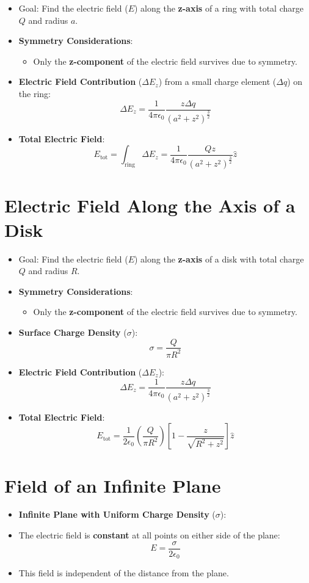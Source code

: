 \documentclass{article}
\begin{document}
\begin{itemize}
    \item Goal: Find the electric field (\(E\)) along the \textbf{z-axis} of a ring with total charge \(Q\) and radius \(a\).
    \item \textbf{Symmetry Considerations}:
    \begin{itemize}
        \item Only the \textbf{z-component} of the electric field survives due to symmetry.
    \end{itemize}
    \item \textbf{Electric Field Contribution} (\(\Delta E_z\)) from a small charge element (\(\Delta q\)) on the ring:
    \[
    \Delta E_z = \frac{1}{4 \pi \epsilon_0} \frac{z \Delta q}{(a^2 + z^2)^{\frac{3}{2}}}
    \]
    \item \textbf{Total Electric Field}:
    \[
    E_{\text{tot}} = \int_{\text{ring}} \Delta E_z = \frac{1}{4 \pi \epsilon_0} \frac{Q z}{(a^2 + z^2)^{\frac{3}{2}}} \hat{z}
    \]
\end{itemize}

\section*{Electric Field Along the Axis of a Disk}
\begin{itemize}
    \item Goal: Find the electric field (\(E\)) along the \textbf{z-axis} of a disk with total charge \(Q\) and radius \(R\).
    \item \textbf{Symmetry Considerations}:
    \begin{itemize}
        \item Only the \textbf{z-component} of the electric field survives due to symmetry.
    \end{itemize}
    \item \textbf{Surface Charge Density} (\(\sigma\)):
    \[
    \sigma = \frac{Q}{\pi R^2}
    \]
    \item \textbf{Electric Field Contribution} (\(\Delta E_z\)):
    \[
        \Delta E_z = \frac{1}{4 \pi \epsilon_0} \frac{z \Delta q}{(a^2 + z^2)^{\frac{3}{2}}}
    \]
    \item \textbf{Total Electric Field}:
    \[
    E_{\text{tot}} = \frac{1}{2 \epsilon_0} \left(\frac{Q}{\pi R^2}  \right) \left[ 1 - \frac{z}{\sqrt{R^2 + z^2}} \right] \hat{z}
    \]
\end{itemize}

\section*{Field of an Infinite Plane}
\begin{itemize}
    \item \textbf{Infinite Plane with Uniform Charge Density} (\(\sigma\)):
    \item The electric field is \textbf{constant} at all points on either side of the plane:
    \[
    E = \frac{\sigma}{2 \epsilon_0}
    \]
    \item This field is independent of the distance from the plane.
\end{itemize}
\end{document}
